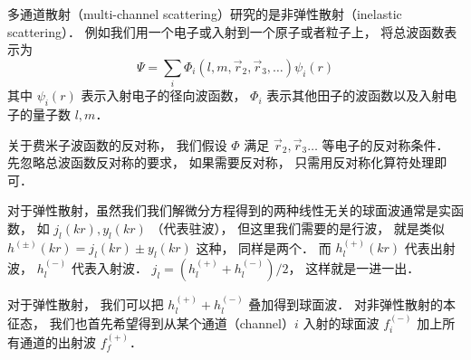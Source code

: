 
多通道散射（multi-channel scattering）研究的是非弹性散射（inelastic scattering）． 例如我们用一个电子或入射到一个原子或者粒子上， 将总波函数表示为
\begin{equation}
\Psi = \sum_i \Phi_i (l, m, \vec r_2, \vec r_3, \dots) \psi_i (r)
\end{equation}
其中 $\psi_i(r)$ 表示入射电子的径向波函数， $\Phi_i$ 表示其他田子的波函数以及入射电子的量子数 $l, m$．

关于费米子波函数的反对称， 我们假设 $\Phi$ 满足 $\vec r_2, \vec r_3 \dots$ 等电子的反对称条件． 先忽略总波函数反对称的要求， 如果需要反对称， 只需用反对称化算符处理即可．

对于弹性散射，虽然我们我们解微分方程得到的两种线性无关的球面波通常是实函数， 如 $j_l(kr), y_l(kr)$ （代表驻波）， 但这里我们需要的是行波， 就是类似 $h^{(\pm)}(kr) = j_l(kr) \pm y_l(kr)$ 这种， 同样是两个． 而 $h_l^{(+)}(kr)$ 代表出射波， $h_l^{(-)}$ 代表入射波． $j_l = (h_l^{(+)} + h_l^{(-)})/2$， 这样就是一进一出．

对于弹性散射， 我们可以把 $h_l^{(+)} + h_l^{(-)}$ 叠加得到球面波． 对非弹性散射的本征态， 我们也首先希望得到从某个通道（channel）$i$ 入射的球面波 $f_i^{(-)}$ 加上所有通道的出射波 $f_f^{(+)}$．
